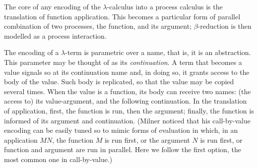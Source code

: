 \documentclass[11pt,a4paper]{amsart}
\theoremstyle{plain}
\theoremstyle{definition}
\theoremstyle{defC}
\theoremstyle{thmC}
\theoremstyle{plain}
\numberwithin{equation}{section}
\theoremstyle{plain}
\theoremstyle{definition}
\begin{document}
The core of any encoding of the  $\lambda$-calculus into a process calculus is the 
translation of function application. This  
becomes a particular form of parallel combination of two processes, the function, and its argument;  
 $\beta$-reduction is then modelled as a process interaction. 


The encoding of a $\lambda$-term is parametric over a name, that is, it is an abstraction.
This parameter may
be thought of as %
its \emph{continuation}.  
A term that becomes a value signals so at its continuation name
and, in doing so, it grants access 
to the body of the value. 
Such body is replicated, so that the value may be
copied several times.
When the value is a function, its body can
receive two names: (the access to) its value-argument, and the
following continuation.
In the translation of application, first, the function is run, then
the argument; finally, the function is informed of its argument and 
continuation.
(Milner noticed \cite{Mil92s} that his
call-by-value encoding can be easily tuned so to mimic
forms of 
evaluation in which, in an application $MN$, the function $M$ is run
first, or the argument $N$ is run first, or function and argument are
run in parallel.  Here we follow  the first option,  the most common  one in
 call-by-value.)
\end{document}
